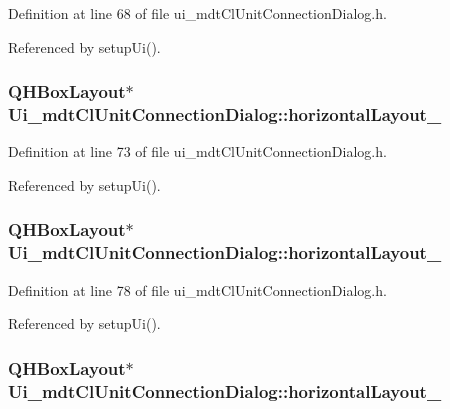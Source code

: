 Definition at line 68 of file ui\-\_\-mdt\-Cl\-Unit\-Connection\-Dialog.\-h.



Referenced by setup\-Ui().

\hypertarget{class_ui__mdt_cl_unit_connection_dialog_a14997475896e523c5614476ebcad9d37}{
\subsubsection[{horizontal\-Layout\-\_\-5}]{\setlength{\rightskip}{0pt plus 5cm}Q\-H\-Box\-Layout$\ast$ Ui\-\_\-mdt\-Cl\-Unit\-Connection\-Dialog\-::horizontal\-Layout\-\_}}\label{class_ui__mdt_cl_unit_connection_dialog_a14997475896e523c5614476ebcad9d37}


Definition at line 73 of file ui\-\_\-mdt\-Cl\-Unit\-Connection\-Dialog.\-h.



Referenced by setup\-Ui().

\hypertarget{class_ui__mdt_cl_unit_connection_dialog_a2af5cc7a5cfe6c8bde1dcc9902276e2a}{
\subsubsection[{horizontal\-Layout\-\_\-6}]{\setlength{\rightskip}{0pt plus 5cm}Q\-H\-Box\-Layout$\ast$ Ui\-\_\-mdt\-Cl\-Unit\-Connection\-Dialog\-::horizontal\-Layout\-\_}}\label{class_ui__mdt_cl_unit_connection_dialog_a2af5cc7a5cfe6c8bde1dcc9902276e2a}


Definition at line 78 of file ui\-\_\-mdt\-Cl\-Unit\-Connection\-Dialog.\-h.



Referenced by setup\-Ui().

\hypertarget{class_ui__mdt_cl_unit_connection_dialog_aa51157504213b711434ca512a8c51c36}{
\subsubsection[{horizontal\-Layout\-\_\-7}]{\setlength{\rightskip}{0pt plus 5cm}Q\-H\-Box\-Layout$\ast$ Ui\-\_\-mdt\-Cl\-Unit\-Connection\-Dialog\-::horizontal\-Layout\-\_}}\label{class_ui__mdt_cl_unit_connection_dialog_aa51157504213b711434ca512a8c51c36}


